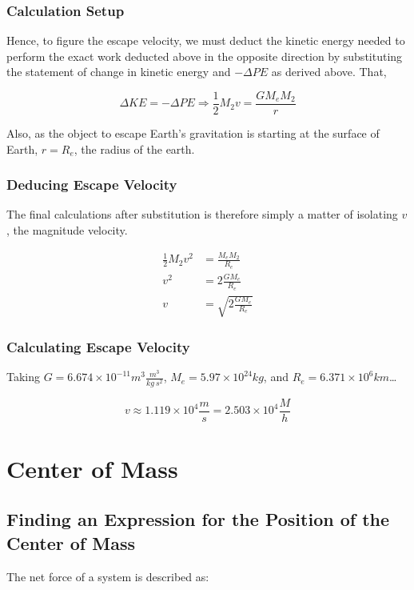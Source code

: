 \documentclass[letterpaper]{article}
\begin{document}
\subsubsection{Calculation Setup}
\label{sec:org368ac5d}
Hence, to figure the escape velocity, we must deduct the kinetic energy needed to perform the exact work deducted above in the opposite direction by substituting the statement of change in kinetic energy and \(-\Delta PE\) as derived above. That,

\begin{equation}
\Delta KE = -\Delta PE \Rightarrow \frac{1}{2}M_2 v = \frac{GM_eM_2}{r}
\end{equation}

Also, as the object to escape Earth's gravitation is starting at the surface of Earth, \(r = R_e\), the radius of the earth.

\subsubsection{Deducing Escape Velocity}
\label{sec:orgb54149f}
The final calculations after substitution is therefore simply a matter of isolating \(v\), the magnitude velocity.

\begin{align}
\frac{1}{2}M_2 v^2 &= \frac{M_eM_2}{R_e} \\
v^2 &= 2\frac{GM_e}{R_e} \\
v &= \sqrt{2\frac{GM_e}{R_e}} 
\end{align}

\subsubsection{Calculating Escape Velocity}
\label{sec:orgaf90f7b}
Taking \(G = 6.674 \times 10^{-11} m^3 \frac{m^3}{kg\ s^2}\), \(M_e = 5.97 \times 10^{24} kg\), and \(R_e = 6.371 \times 10^6 km\)\ldots{}

\begin{equation}
v \approx 1.119 \times 10^4 \frac{m}{s} = 2.503 \times 10^4 \frac{M}{h}
\end{equation}

\section{Center of Mass}
\label{sec:org4bfbc86}

\subsection{Finding an Expression for the Position of the Center of Mass}
\label{sec:org8b1f90c}
The net force of a system is described as:
\end{document}
